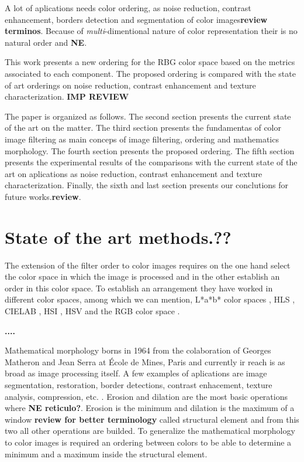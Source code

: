 A lot of aplications needs color ordering, as noise reduction, contrast enhancement, borders detection and segmentation of color images\textbf{review terminos}\cite{ortiz2002procesamiento}. Because of \textit{multi}-dimentional nature of color representation their is no natural order and \textbf{NE}.


This work presents a new ordering for the RBG color space based on the metrics associated to each component. The proposed ordering is compared with the state of art orderings on noise reduction, contrast enhancement and texture characterization. \textbf{IMP REVIEW}


The paper is organized as follows. The second section presents the current state of the art on the matter. The third section presents the fundamentas of color image filtering as main conceps of image filtering, ordering and mathematics morphology. The fourth section presents the proposed ordering. The fifth section presents the experimental results of the comparisons with the current state of the art on aplications as noise reduction, contrast enhancement and texture characterization. Finally, the sixth and last section presents our conclutions for future works.\textbf{review}.

\section{State of the art \textbf{methods.??}}
\label{Relacionados}

The extension of the filter order to color images requires on the one hand select the color space in which the image is processed and in the other establish an order in this color space. To establish an arrangement they have worked in different color spaces, among which we can mention, L*a*b* color spaces \cite{hanbury2001mathematical}, HLS \cite{hanbury2001mathematical2},  CIELAB \cite{hanbury2002mathematical3}, HSI \cite{tobar2007mathematical}, HSV \cite{lei2013vector} and the RGB color space  \cite{zaharescu2003color, gao2013adaptive, wang2012edge}.

\textbf{....}


Mathematical morphology borns in 1964 from the colaboration of Georges Matheron and Jean Serra at École de Mines, Paris \cite{serra1982image} and currently ir reach is as broad as image processing itself. A few examples of aplications are image segmentation, restoration, border detections, contrast enhacement, texture analysis, compression, etc. \cite{ortiz2002procesamiento}.
Erosion and dilation are the most basic operations where \textbf{NE reticulo?}\cite{heijmans1990algebraic}. Erosion is the minimum and dilation is the maximum of a window \textbf{review for better terminology} called structural element and from this two all other operations are builded. To generalize the mathematical morphology to color images is required an ordering between colors to be able to determine a minimum and a maximum inside the structural element.


